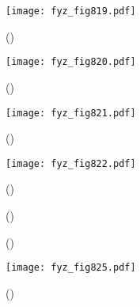     \begin{figure}[ht!] %
      \centering
      \texttt{[image: fyz\_fig819.pdf]}
      \caption{
               (\cite[s.~707]{Feynman02})}
      \label{fyz:fig819}
    \end{figure}

    \begin{figure}[ht!] %
      \centering
      \texttt{[image: fyz\_fig820.pdf]}
      \caption{
               (\cite[s.~707]{Feynman02})}
      \label{fyz:fig820}
    \end{figure}

    \begin{figure}[ht!] %
      \centering
      \texttt{[image: fyz\_fig821.pdf]}
      \caption{
               (\cite[s.~707]{Feynman02})}
      \label{fyz:fig821}
    \end{figure}

    \begin{figure}[ht!] %
      \centering
      \texttt{[image: fyz\_fig822.pdf]}
      \caption{
               (\cite[s.~707]{Feynman02})}
      \label{fyz:fig822}
    \end{figure}

    \begin{figure}[ht!]
      \centering
                     \newline
                     \newline
      \caption{
               (\cite[s.~748]{Feynman02})}
      \label{fyz:fig823}
    \end{figure}

    \begin{figure}[ht!]
      \centering
                     \newline
                     \newline
      \caption{
               (\cite[s.~748]{Feynman02})}
      \label{fyz:fig824}
    \end{figure}

    \begin{figure}[ht!] %
      \centering
      \texttt{[image: fyz\_fig825.pdf]}
      \caption{
               (\cite[s.~707]{Feynman02})}
      \label{fyz:fig825}
    \end{figure}

